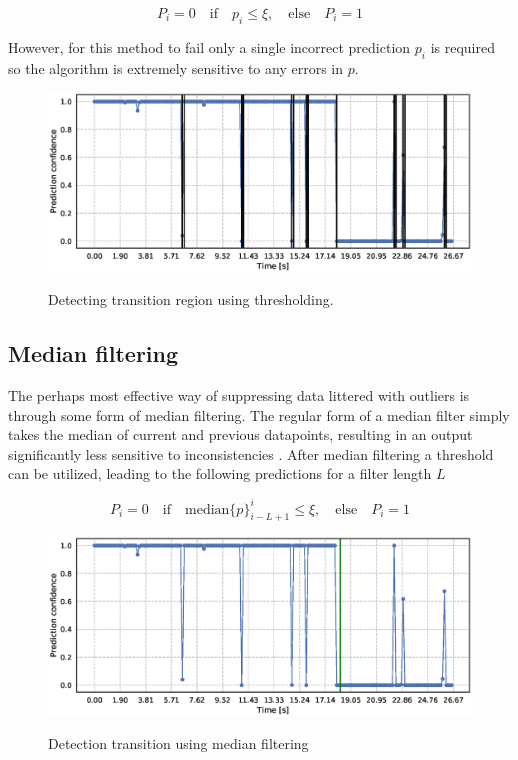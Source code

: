 \begin{equation}
	P_i=0 \quad\text{if}\quad p_i\leq\xi, \quad
	\text{else} \quad P_i=1
\end{equation}

However, for this method to fail only a single incorrect prediction $p_i$ is required so the algorithm is extremely sensitive to any errors in $p$.

\begin{figure}
	\includegraphics[scale=0.5]{figs_temp/detect_thresh}
	\label{fig:detect_thresh}
	\caption{Detecting transition region using thresholding.}
\end{figure}

\subsection{Median filtering}

The perhaps most effective way of suppressing data littered with outliers is through some form of median filtering. The regular form of a median filter simply takes the median of current and previous datapoints, resulting in an output significantly less sensitive to inconsistencies \citep{pearson_2002}. After median filtering a threshold can be utilized, leading to the following predictions for a filter length $L$

\begin{equation}
	P_i=0 \quad\text{if}\quad\text{median}\{p\}_{i-L+1}^i\leq\xi, 
	\quad \text{else} \quad P_i = 1
\end{equation}

\begin{figure}
	\includegraphics[scale=0.5]{figs_temp/detect_median}
	\label{fig:detect_median}
	\caption{Detection transition using median filtering}
\end{figure}

